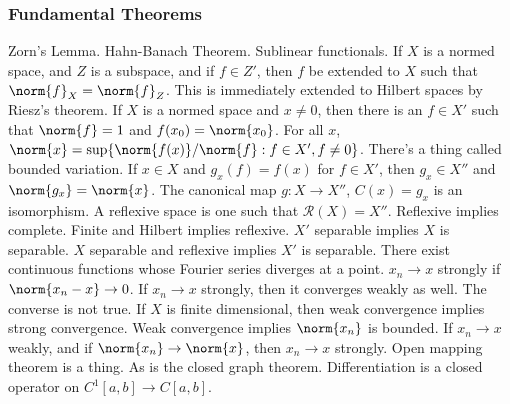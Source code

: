 \documentclass[crop=false,class=article,oneside]{standalone}
\begin{document}
        \subsubsection{Fundamental Theorems}
            Zorn's Lemma. Hahn-Banach Theorem. Sublinear functionals.
            If $X$ is a normed space, and $Z$ is a subspace, and if
            $f\in{Z'}$, then $f$ be extended to $X$ such that
            $\norm{f}_{X}=\norm{f}_{Z}$. This is immediately extended to
            Hilbert spaces by Riesz's theorem. If $X$ is a normed space
            and $x\ne{0}$, then there is an $f\in{X'}$ such that
            $\norm{f}=1$ and $f(x_{0})=\norm{x_{0}}$. For all $x$,
            $\norm{x}=\sup\{\norm{f(x)}/\norm{f}:f\in{X'},f\ne{0}\}$.
            There's a thing called bounded variation. If $x\in{X}$ and
            $g_{x}(f)=f(x)$ for $f\in{X'}$, then
            $g_{x}\in{X''}$ and $\norm{g_{x}}=\norm{x}$.
            The canonical map $g:X\rightarrow{X''}$,
            $C(x)=g_{x}$ is an isomorphism.
            A reflexive space is one such that
            $\mathscr{R}(X)=X''$.
            Reflexive implies complete. Finite and Hilbert implies
            reflexive.
            $X'$ separable implies $X$ is separable.
            $X$ separable and reflexive implies $X'$ is separable.
            There exist continuous functions whose Fourier series
            diverges at a point. $x_{n}\rightarrow{x}$ strongly if
            $\norm{x_{n}-x}\rightarrow{0}$. If $x_{n}\rightarrow{x}$
            strongly, then it converges weakly as well. The converse is
            not true. If $X$ is finite dimensional, then weak convergence
            implies strong convergence. Weak convergence implies
            $\norm{x_{n}}$ is bounded. If
            $x_{n}\rightarrow{x}$ weakly, and if
            $\norm{x_{n}}\rightarrow\norm{x}$, then
            $x_{n}\rightarrow{x}$ strongly. Open mapping theorem is
            a thing. As is the closed graph theorem. Differentiation
            is a closed operator on $C^{1}[a,b]\rightarrow{C[a,b]}$.
\end{document}
